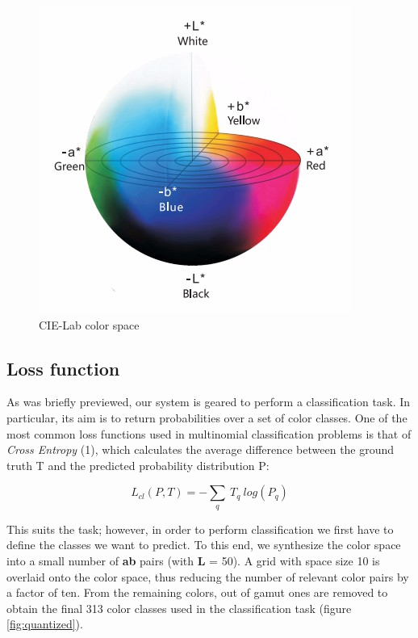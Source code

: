 \documentclass[twoside,twocolumn]{article}
\begin{document}
\begin{figure} [h]
	\includegraphics[width=\linewidth]{img/cielab.jpg}
	\caption{CIE-Lab color space}
	\label{fig:cielab}
\end{figure}

\subsection{Loss function}
As was briefly previewed, our system is geared to perform a classification task. In particular, its aim is to return probabilities over a set of color classes. One of the most common loss functions used in multinomial classification problems is that of \textit{Cross Entropy} (1), which calculates the average difference between the ground truth T and the predicted probability distribution P:

\begin{equation}
L_{cl}(P,T) = - \sum_{q} \: T_q \: log(P_q)
\end{equation}

This suits the task; however, in order to perform classification we first have to define the classes we want to predict. To this end, we synthesize the color space into a small number of \textbf{ab} pairs (with \textbf{L} = 50). A grid with space size 10 is overlaid onto the color space, thus reducing the number of relevant color pairs by a factor of ten. From the remaining colors, out of gamut ones are removed to obtain the final 313 color classes used in the classification task (figure \ref{fig:quantized}).
\end{document}
